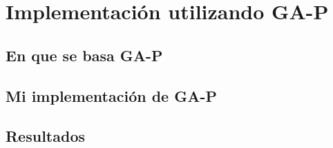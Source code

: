 \section{Implementación utilizando GA-P}

\subsection{En que se basa GA-P}

\subsection{Mi implementación de GA-P}

\subsection{Resultados}
